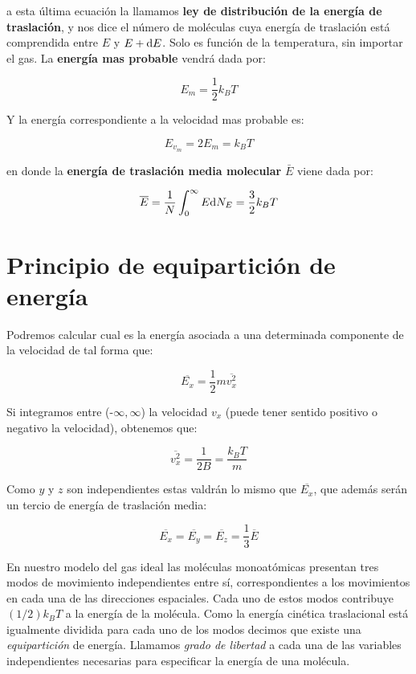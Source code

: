 \documentclass[12pt]{book}
\begin{document}
a esta última ecuación la llamamos \textbf{ley de distribución de la energía de traslación}, y nos dice el número de moléculas cuya energía de traslación está comprendida entre $E$ y $E + \mathrm{d} E$. Solo es función de la temperatura, sin importar el gas. La \textbf{energía mas probable} vendrá dada por:

\begin{equation}
E_m = \dfrac{1}{2} k_B T
\end{equation}

Y la energía correspondiente a la velocidad mas probable es:

\begin{equation}
E_{v_m} = 2 E_m = k_B T
\end{equation}

en donde la \textbf{energía de traslación media molecular } $\bar{E}$ viene dada por:

\begin{equation}
\overline{E} = \dfrac{1}{N} \int_{0}^{\infty} E \mathrm{d} N_E  = \dfrac{3}{2} k_B T
\end{equation}

\section{Principio de equipartición de energía}

Podremos calcular cual es la energía asociada a una determinada componente de la velocidad de tal forma que:

\begin{equation}
\overline{E_x} = \dfrac{1}{2} m \overline{v^2_x}
\end{equation}

Si integramos entre (-$\infty, \infty$) la velocidad $v_x$ (puede tener sentido positivo o negativo la velocidad), obtenemos que:

\begin{equation}
\overline{v^2_x} = \dfrac{1}{2 B} = \dfrac{k_B T}{m}
\end{equation}

Como $y$ y $z$ son independientes estas valdrán lo mismo que $\overline{E_x}$, que además serán un tercio de energía de traslación media:

\begin{equation}
\overline{E_x} = 
\overline{E_y} =
\overline{E_z} = \dfrac{1}{3} \overline{E}
\end{equation}

En nuestro modelo del gas ideal las moléculas monoatómicas presentan tres modos de movimiento independientes entre sí, correspondientes a los movimientos en cada una de las direcciones espaciales. Cada uno de estos modos contribuye $(1/2) k_B T$ a la energía de la molécula. Como la energía cinética traslacional está igualmente dividida para cada uno de los modos decimos que existe una \textit{equipartición} de energía. Llamamos \textit{grado de libertad} a cada una de las variables independientes necesarias para especificar la energía de una molécula. \\
\end{document}
